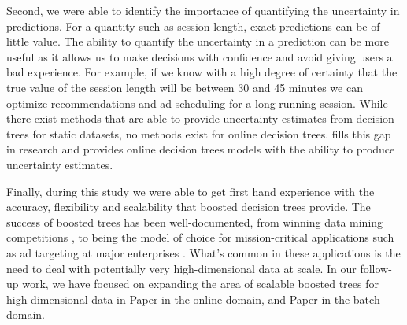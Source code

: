Second, we were able to identify the importance of quantifying the uncertainty
in predictions. For a quantity such as session length, exact predictions can
be of little value.
The ability to quantify the uncertainty in a prediction can be more useful as
it allows us to make decisions with confidence and avoid giving users
a bad experience.
For example, if we know with a high degree of certainty
that the true value of the session length will be between 30 and 45 minutes
we can optimize recommendations and ad scheduling for a long running session.
While there exist methods that are able to provide uncertainty estimates
from decision trees for static datasets, no methods exist for online decision trees.
\uncertaintrees
fills this gap in research and provides online decision trees models
with the ability to produce uncertainty estimates.

Finally, during this study we were able to get first hand experience with
the accuracy, flexibility and scalability that boosted decision trees
provide. The success of boosted trees has been well-documented,
from winning data mining competitions \cite{xgboost}, to being the model of choice for mission-critical
applications such as ad targeting at major enterprises \cite{mcrank, ctr-facebook}.
What's common in these applications is the need to deal with potentially very
high-dimensional data at scale.
In our follow-up work, we have focused on expanding the
area of scalable boosted trees for high-dimensional data in Paper \boostvhtNum in the online
domain, and Paper \blockgbtNum in the batch domain.